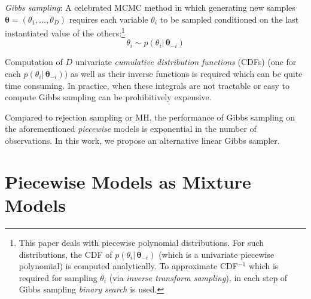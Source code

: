 \documentclass[letterpaper]{article}
\begin{document}
\emph{Gibbs sampling}:
A celebrated MCMC method in which generating new samples $\boldsymbol{\theta} = ({\theta}_1, \ldots, {\theta}_D)$ requires each variable $\theta_i$ to be sampled conditioned on
the last instantiated value of the others:\footnote{
This paper deals with piecewise polynomial distributions. For such distributions, the CDF of $p(\theta_i | \, \boldsymbol\theta_{-i})$
(which is a univariate piecewise polynomial)
 is computed analytically. 
To approximate CDF$^{-1}$ which is required for sampling $\theta_i$ (via \emph{inverse transform sampling}), in each step of Gibbs sampling \emph{binary search} is used.
} %
\begin{equation}
\label{eq:gibbs}
{\theta}_i \sim p({\theta}_i | \, \boldsymbol{\theta}_{-i})
\end{equation} 

Computation of $D$ univariate \emph{cumulative distribution functions} (CDFs) 
(one for each $p({\theta}_i | \, \boldsymbol{\theta}_{-i})$) as well as their inverse functions is required which can be quite time consuming. 
In practice, when these integrals are not tractable or easy to compute Gibbs sampling can be prohibitively expensive.   

Compared to rejection sampling or MH, the performance of Gibbs sampling on the aforementioned \emph{piecewise} models is exponential in the number of observations.  
In this work, we propose an alternative linear Gibbs sampler.


\section{Piecewise Models as Mixture Models}
\label{sect:mix}
\end{document}
